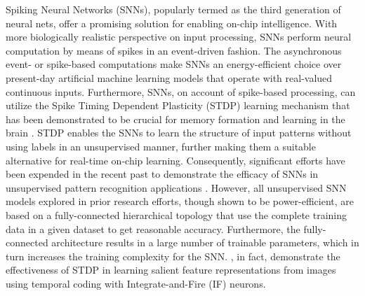 \documentclass[journal, onecolumn]{IEEEtran}
\begin{document}
Spiking Neural Networks (SNNs), popularly termed as the third generation of neural nets, offer a promising solution for enabling on-chip intelligence. With more biologically realistic perspective on input processing, SNNs perform neural computation by means of spikes in an event-driven fashion. The asynchronous event- or spike-based computations make SNNs an energy-efficient choice over present-day artificial machine learning models that operate with real-valued continuous inputs. Furthermore, SNNs, on account of spike-based processing, can utilize the Spike Timing Dependent Plasticity (STDP) learning mechanism that has been demonstrated to be crucial for memory formation and learning in the brain \cite{masquelier2009competitive, dan2004spike}. STDP enables the SNNs to learn the structure of input patterns without using labels in an unsupervised manner, further making them a suitable alternative for real-time on-chip learning. Consequently, significant efforts have been expended in the recent past to demonstrate the efficacy of SNNs in unsupervised pattern recognition applications \cite{diehl2015unsupervised, querlioz2011simulation, kasabov2013dynamic, masquelier2007unsupervised, kheradpisheh2016stdp, kheradpisheh2016bio}. However, all unsupervised SNN models explored in prior research efforts, though shown to be power-efficient, are based on a fully-connected hierarchical topology \cite{diehl2015unsupervised, querlioz2011simulation} that use the complete training data in a given dataset to get reasonable accuracy. Furthermore, the fully-connected architecture results in a large number of trainable parameters, which in turn increases the training complexity for the SNN. \cite{masquelier2007unsupervised, kheradpisheh2016stdp, kheradpisheh2016bio}, in fact, demonstrate the effectiveness of STDP in learning salient feature representations from images using temporal coding with Integrate-and-Fire (IF) neurons. 
\end{document}
